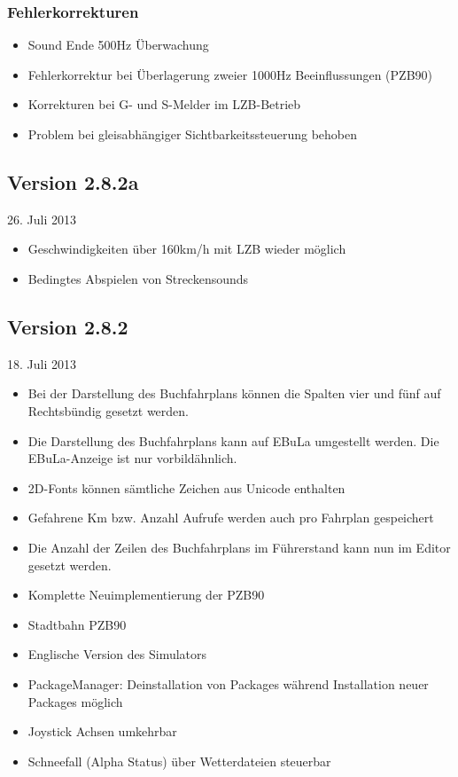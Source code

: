 \subsubsection{Fehlerkorrekturen}
\begin{itemize}
\item Sound Ende 500Hz Überwachung
\item Fehlerkorrektur bei Überlagerung zweier 1000Hz Beeinflussungen (PZB90)
\item Korrekturen bei G- und S-Melder im LZB-Betrieb
\item Problem bei gleisabhängiger Sichtbarkeitssteuerung behoben
\end{itemize}

\subsection{Version 2.8.2a}\hfill 26. Juli 2013

\begin{itemize}
\itemsep1pt\parskip0pt
\item
  Geschwindigkeiten über 160km/h mit LZB wieder möglich
\item
  Bedingtes Abspielen von Streckensounds
\end{itemize}

\subsection{Version 2.8.2}\hfill 18. Juli 2013

\begin{itemize}
\itemsep1pt\parskip0pt
\item
  Bei der Darstellung des Buchfahrplans können die Spalten vier und fünf
  auf Rechtsbündig gesetzt werden.
\item
  Die Darstellung des Buchfahrplans kann auf EBuLa umgestellt werden.
  Die EBuLa-Anzeige ist nur vorbildähnlich.
\item
  2D-Fonts können sämtliche Zeichen aus Unicode enthalten
\item
  Gefahrene Km bzw. Anzahl Aufrufe werden auch pro Fahrplan gespeichert
\item
  Die Anzahl der Zeilen des Buchfahrplans im Führerstand kann nun im
  Editor gesetzt werden.
 \item 
  Komplette Neuimplementierung der PZB90
\item
  Stadtbahn PZB90  
\item
  Englische Version des Simulators
\item
  PackageManager: Deinstallation von Packages während Installation neuer
  Packages möglich
\item
  Joystick Achsen umkehrbar
\item
  Schneefall (Alpha Status) über Wetterdateien steuerbar
\end{itemize}

